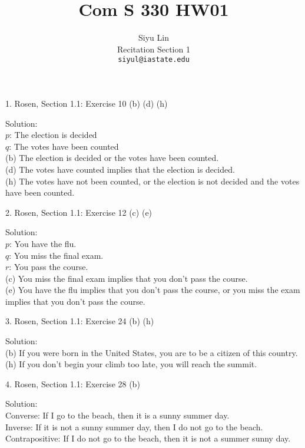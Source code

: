 \documentclass[12pt]{article}
\title{Com S 330 HW01}
\author{Siyu Lin \\Recitation Section 1\\ \texttt{siyul@iastate.edu}}
\begin{document}
\maketitle

1. Rosen, Section 1.1: Exercise 10 (b) (d) (h)

\indent Solution:\\
\indent $p$: The election is decided\\
\indent $q$: The votes have been counted\\
\indent (b) The election is decided or the votes have been counted.\\
\indent (d) The votes have counted implies that the election is decided.\\
\indent (h) The votes have not been counted, or the election is not decided and the votes have been counted.\\
\newline

2. Rosen, Section 1.1: Exercise 12 (c) (e)

\indent Solution:\\
\indent $p$: You have the flu.\\
\indent $q$: You miss the final exam.\\
\indent $r$: You pass the course.\\
\indent (c) You miss the final exam implies that you don't pass the course.\\
\indent (e) You have the flu implies that you don't pass the course, or you miss the exam implies that you don’t pass the course. \\
\newline

3. Rosen, Section 1.1: Exercise 24 (b) (h)

\indent Solution:\\
\indent (b) If you were born in the United States, you are to be a citizen of this country.\\
\indent (h) If you don’t begin your climb too late, you will reach the summit.\\
\newline

4. Rosen, Section 1.1: Exercise 28 (b)

\indent Solution:\\
\indent Converse: If I go to the beach, then it is a sunny summer day.\\
\indent Inverse: If it is not a sunny summer day, then I do not go to the beach.\\
\indent Contrapositive: If I do not go to the beach, then it is not a summer sunny day.\\
\newline
\end{document}
